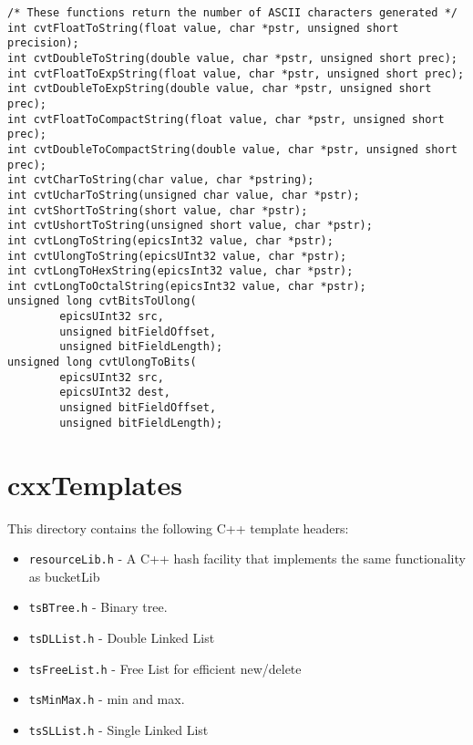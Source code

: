 \begin{verbatim}
/* These functions return the number of ASCII characters generated */
int cvtFloatToString(float value, char *pstr, unsigned short precision);
int cvtDoubleToString(double value, char *pstr, unsigned short prec);
int cvtFloatToExpString(float value, char *pstr, unsigned short prec);
int cvtDoubleToExpString(double value, char *pstr, unsigned short prec);
int cvtFloatToCompactString(float value, char *pstr, unsigned short prec);
int cvtDoubleToCompactString(double value, char *pstr, unsigned short prec);
int cvtCharToString(char value, char *pstring);
int cvtUcharToString(unsigned char value, char *pstr);
int cvtShortToString(short value, char *pstr);
int cvtUshortToString(unsigned short value, char *pstr);
int cvtLongToString(epicsInt32 value, char *pstr);
int cvtUlongToString(epicsUInt32 value, char *pstr);
int cvtLongToHexString(epicsInt32 value, char *pstr);
int cvtLongToOctalString(epicsInt32 value, char *pstr);
unsigned long cvtBitsToUlong(
        epicsUInt32 src,
        unsigned bitFieldOffset,
        unsigned bitFieldLength);
unsigned long cvtUlongToBits(
        epicsUInt32 src,
        epicsUInt32 dest,
        unsigned bitFieldOffset,
        unsigned bitFieldLength);
\end{verbatim}

\section{cxxTemplates}

This directory contains the following C++ template headers:

\begin{itemize}
\item \verb|resourceLib.h| - A C++ hash facility that implements the same functionality as bucketLib

\item \verb|tsBTree.h| - Binary tree.

\item \verb|tsDLList.h| - Double Linked List

\item \verb|tsFreeList.h| - Free List for efficient new/delete

\item \verb|tsMinMax.h| - min and max.

\item \verb|tsSLList.h| - Single Linked List

\end{itemize}

